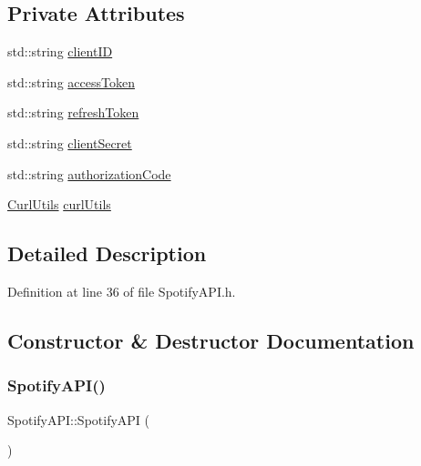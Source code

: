 \subsection*{Private Attributes}
\begin{DoxyCompactItemize}
\item 
std\+::string \mbox{\hyperlink{class_spotify_a_p_i_a5d3139a222c2bb1c1ce89c6662415498}{client\+ID}}
\item 
std\+::string \mbox{\hyperlink{class_spotify_a_p_i_aff771a96c8035e8249c991728441c69f}{access\+Token}}
\item 
std\+::string \mbox{\hyperlink{class_spotify_a_p_i_a7d9fb5a2dd5ba6316b08f00837a49114}{refresh\+Token}}
\item 
std\+::string \mbox{\hyperlink{class_spotify_a_p_i_ad224830079fb99c611f0515affcc2258}{client\+Secret}}
\item 
std\+::string \mbox{\hyperlink{class_spotify_a_p_i_afca74498062e41e29b9107a57d66b0bc}{authorization\+Code}}
\item 
\mbox{\hyperlink{class_curl_utils}{Curl\+Utils}} \mbox{\hyperlink{class_spotify_a_p_i_ad8c3e91120c518244daa8ef2479131b3}{curl\+Utils}}
\end{DoxyCompactItemize}


\subsection{Detailed Description}


Definition at line 36 of file Spotify\+A\+P\+I.\+h.



\subsection{Constructor \& Destructor Documentation}
\mbox{\label{class_spotify_a_p_i_ab0d1896e2ab4c52f496eb494640a89b1}} 
\subsubsection{\texorpdfstring{Spotify\+A\+P\+I()}{SpotifyAPI()}}
{\footnotesize\ttfamily Spotify\+A\+P\+I\+::\+Spotify\+A\+PI (\begin{DoxyParamCaption}{ }\end{DoxyParamCaption})}



